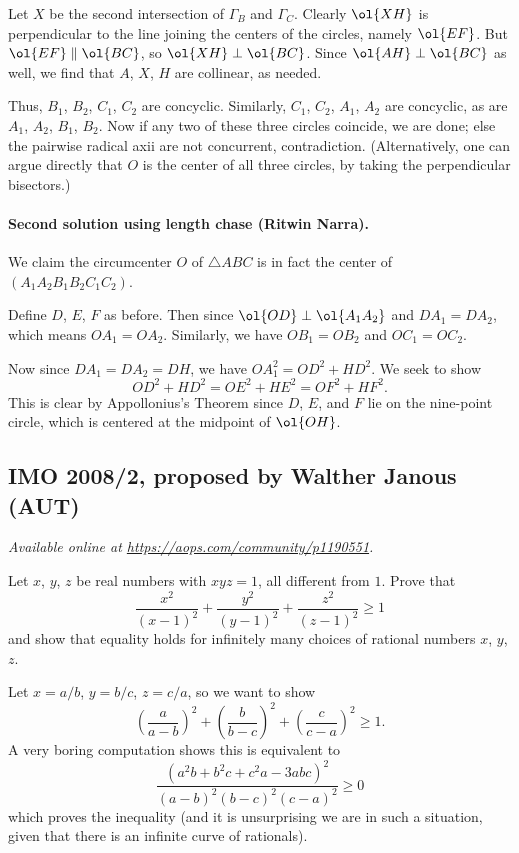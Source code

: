 \documentclass[11pt]{scrartcl}
\begin{document}
Let $X$ be the second intersection of $\Gamma_B$ and $\Gamma_C$.
Clearly $\ol{XH}$ is perpendicular to the line
joining the centers of the circles, namely $\ol{EF}$.
But $\ol{EF} \parallel \ol{BC}$, so $\ol{XH} \perp \ol{BC}$.
Since $\ol{AH} \perp \ol{BC}$ as well,
we find that $A$, $X$, $H$ are collinear, as needed.

Thus, $B_1$, $B_2$, $C_1$, $C_2$ are concyclic.
Similarly, $C_1$, $C_2$, $A_1$, $A_2$ are concyclic,
as are $A_1$, $A_2$, $B_1$, $B_2$.
Now if any two of these three circles coincide, we are done;
else the pairwise radical axii are not concurrent, contradiction.
(Alternatively, one can argue directly that $O$ is the center of all
three circles, by taking the perpendicular bisectors.)

\paragraph{Second solution using length chase (Ritwin Narra).}
We claim the circumcenter $O$ of $\triangle ABC$
is in fact the center of $(A_1A_2B_1B_2C_1C_2)$.

Define $D$, $E$, $F$ as before.
Then since $\ol{OD} \perp \ol{A_1A_2}$ and $DA_1 = DA_2$,
which means $OA_1 = OA_2$. Similarly, we have $OB_1 = OB_2$ and $OC_1 = OC_2$.

Now since $DA_1 = DA_2 = DH$, we have $OA_1^2 = OD^2 + HD^2$.
We seek to show
\[ OD^2 + HD^2 = OE^2 + HE^2 = OF^2 + HF^2. \]
This is clear by Appollonius's Theorem
since $D$, $E$, and $F$ lie on the nine-point circle,
which is centered at the midpoint of $\ol{OH}$.
\pagebreak

\subsection{IMO 2008/2, proposed by Walther Janous (AUT)}
\textsl{Available online at \url{https://aops.com/community/p1190551}.}
\begin{mdframed}[style=mdpurplebox,frametitle={Problem statement}]
Let $x$, $y$, $z$ be real numbers with $xyz = 1$,
all different from $1$.
Prove that
\[ \frac{x^2}{(x-1)^2} + \frac{y^2}{(y-1)^2}
+ \frac{z^2}{(z-1)^2} \ge 1 \]
and show that equality holds for infinitely many choices
of rational numbers $x$, $y$, $z$.
\end{mdframed}
Let $x=a/b$, $y=b/c$, $z=c/a$, so we want to show
\[ \left(\frac{a}{a-b}\right)^2+\left(\frac{b}{b-c}\right)^2
  +\left(\frac{c}{c-a}\right)^2\ge 1.\]
A very boring computation shows this is equivalent to
\[ \frac{(a^2b+b^2c+c^2a-3abc)^2}%
  {(a-b)^2(b-c)^2(c-a)^2}\ge 0\]
which proves the inequality
(and it is unsurprising we are in such a situation,
given that there is an infinite curve of rationals).
\end{document}
